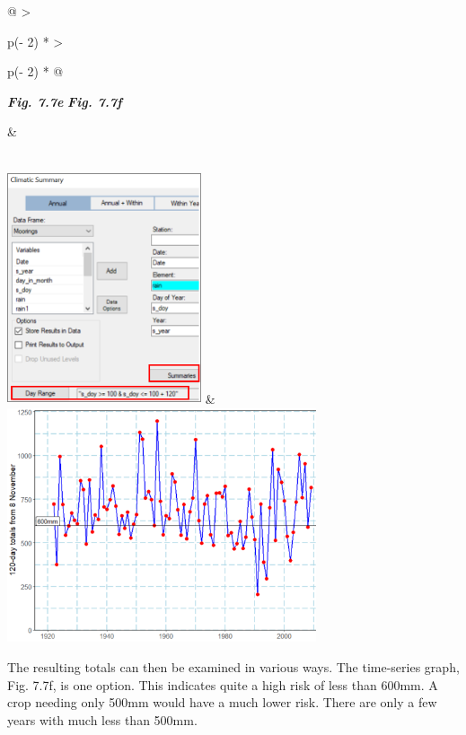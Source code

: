 \documentclass[
  letterpaper,
  DIV=11,
  numbers=noendperiod]{scrreprt}
\begin{document}
\begin{longtable}[]{@{}
  >{\raggedright\arraybackslash}p{(\columnwidth - 2\tabcolsep) * }
  >{\raggedright\arraybackslash}p{(\columnwidth - 2\tabcolsep) * }@{}}
\toprule\noalign{}
\begin{minipage}[b]{\linewidth}\raggedright
\textbf{\emph{Fig. 7.7e}} \textbf{\emph{Fig. 7.7f}}
\end{minipage} & \begin{minipage}[b]{\linewidth}\raggedright
\end{minipage} \\
\midrule\noalign{}
\endhead
\bottomrule\noalign{}
\endlastfoot
\includegraphics[width=2.25091in,height=2.70109in]{figures/Fig7.7e.png}
&
\includegraphics[width=3.58516in,height=2.72005in]{figures/Fig7.7f.png} \\
\end{longtable}

The resulting totals can then be examined in various ways. The
time-series graph, Fig. 7.7f, is one option. This indicates quite a high
risk of less than 600mm. A crop needing only 500mm would have a much
lower risk. There are only a few years with much less than 500mm.
\end{document}
